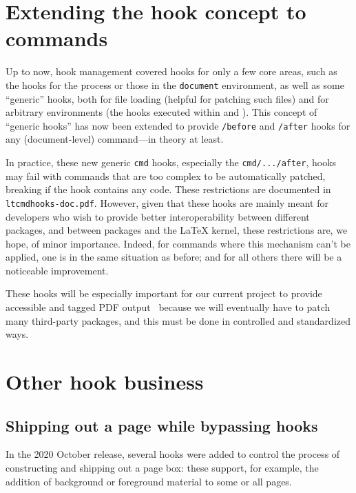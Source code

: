 \documentclass{ltnews}
\providecommand\Dash {---}
\providecommand\hook[1]{\texttt{#1}}
\providecommand\env[1]{\texttt{#1}}
\providecommand\env[1]{\texttt{#1}}
\begin{document}
\section{Extending the hook concept to commands}

Up to now, hook management covered hooks for only a few core areas,
such as the hooks for the  process or those in the
\env{document} environment, as well as some \enquote {generic} hooks,
both for file loading (helpful for patching such files) and for
arbitrary environments (the hooks executed within  and
).  This concept of \enquote{generic hooks} has now been
extended to provide \hook{/before} and \hook{/after} hooks for any
(document-level) command\Dash in theory at least.


In practice, these new generic \hook{cmd} hooks, especially the
\hook{cmd/.../after}, hooks may fail with commands that are too
complex to be automatically patched, breaking if the hook contains any
code.  These restrictions are documented in
\texttt{ltcmdhooks-doc.pdf}.
%   
However, given that these hooks are mainly meant for developers who
wish to provide better interoperability between different packages,
and between packages and the \LaTeX{} kernel, these restrictions are,
we hope, of minor importance.  Indeed, for commands where this
mechanism can't be applied, one is in the same situation as before;
and for all others there will be a noticeable improvement.

These hooks will be especially important for our current project to
provide accessible and tagged PDF output~\cite{33:blueprint} because
we will eventually have to patch many third-party packages, and this
must be done in controlled and standardized ways.




\section{Other hook business}


\subsection{Shipping out a page while bypassing hooks}

In the 2020 October release, several hooks were added to control the
process of constructing and shipping out a page box: these support,
for example, the addition of background or foreground material 
to some or all pages.
\end{document}
